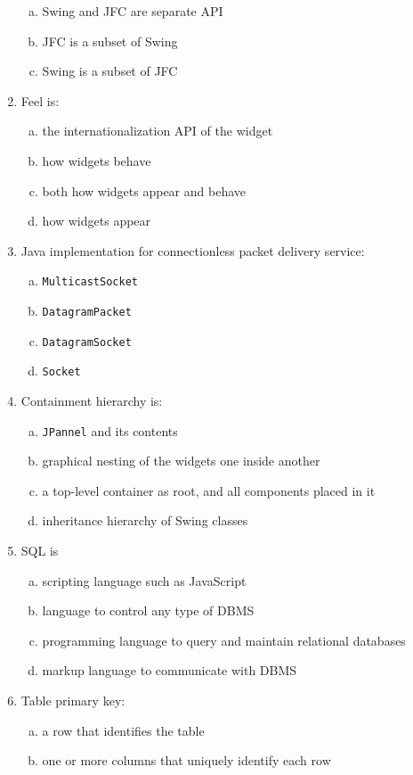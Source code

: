 \documentclass[10pt,a4paper,twocolumn]{article}
\begin{document}
\begin{enumerate}
\begin{enumerate}[(a)]
	\item Swing and JFC are separate API
	\item JFC is a subset of Swing
	\item Swing is a subset of JFC
\end{enumerate}
\item Feel is:
\begin{enumerate}[(a)]
	\item the internationalization API of the widget
	\item how widgets behave
	\item both how widgets appear and behave
	\item how widgets appear
\end{enumerate}
\item Java implementation for connectionless packet delivery service:
\begin{enumerate}[(a)]
	\item \texttt{MulticastSocket}
	\item \texttt{DatagramPacket}
	\item \texttt{DatagramSocket}
	\item \texttt{Socket}
\end{enumerate}
\item Containment hierarchy is:
\begin{enumerate}[(a)]
	\item \texttt{JPannel} and its contents
	\item graphical nesting of the widgets one inside another
	\item a top-level container as root, and all components placed in it
	\item inheritance hierarchy of Swing classes
\end{enumerate}
\item SQL is
\begin{enumerate}[(a)]
	\item scripting language such as JavaScript
	\item language to control any type of DBMS
	\item programming language to query and maintain relational databases
	\item markup language to communicate with DBMS
\end{enumerate}
\item Table primary key:
\begin{enumerate}[(a)]
	\item a row that identifies the table
	\item one or more columns that uniquely identify each row

\end{enumerate}
\end{enumerate}
\end{document}
